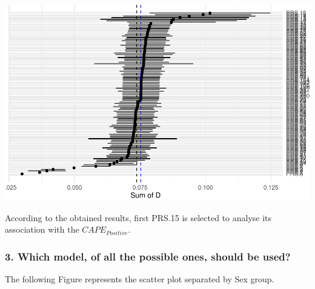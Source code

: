 \documentclass[
]{article}
\newenvironment{Shaded}{\begin{snugshade}}{\end{snugshade}}
\newcommand{\AttributeTok}[1]{\textcolor[rgb]{0.77,0.63,0.00}{#1}}
\newcommand{\CommentTok}[1]{\textcolor[rgb]{0.56,0.35,0.01}{\textit{#1}}}
\newcommand{\DecValTok}[1]{\textcolor[rgb]{0.00,0.00,0.81}{#1}}
\newcommand{\FloatTok}[1]{\textcolor[rgb]{0.00,0.00,0.81}{#1}}
\newcommand{\FunctionTok}[1]{\textcolor[rgb]{0.00,0.00,0.00}{#1}}
\newcommand{\NormalTok}[1]{#1}
\newcommand{\OtherTok}[1]{\textcolor[rgb]{0.56,0.35,0.01}{#1}}
\newcommand{\SpecialCharTok}[1]{\textcolor[rgb]{0.00,0.00,0.00}{#1}}
\newcommand{\StringTok}[1]{\textcolor[rgb]{0.31,0.60,0.02}{#1}}
\begin{document}
\includegraphics{Real_data_CAPE_Positive_code_files/figure-latex/unnamed-chunk-5-1.pdf}

According to the obtained results, first PRS.15 is selected to analyse
its association with the \(CAPE_{Positive}\).

\hypertarget{which-model-of-all-the-possible-ones-should-be-used}{%
\subsubsection{3. Which model, of all the possible ones, should be
used?}\label{which-model-of-all-the-possible-ones-should-be-used}}

The following Figure represents the scatter plot separated by Sex group.

\begin{Shaded}
\end{Shaded}
\end{document}

